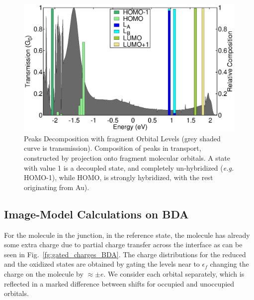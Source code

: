 \documentclass[aip,jcp,a4paper,reprint,floatfix,superscriptaddress]{revtex4-1}
\newcommand{\etal}{\emph{et al.}\xspace}
\newcommand{\eg}{\emph{e.g.}\xspace}
\begin{document}
\begin{figure}
   \includegraphics[width=\columnwidth]{img/BDA/BDA-decomposition}
\caption{Peaks Decomposition with fragment Orbital Levels (grey shaded curve is transmission). Composition of peaks in transport, constructed by projection onto fragment molecular orbitals. A state with value 1 is a decoupled state, and completely un-hybridized (\eg HOMO-1), while HOMO, is strongly hybridized, with the rest originating from Au).}\label{fg:BDA-peak-composition}
\end{figure}



\subsection{Image-Model Calculations on BDA}\label{imagemodelcalcsBDA}

For the molecule in the junction, %
in the reference state, the molecule %
has already some extra charge due to partial charge transfer across the interface \cite{Thygesen2009} as can be seen in Fig.~\ref{fg:gated_charges_BDA}. The charge distributions for the reduced and the oxidized states are obtained by gating the levels near to $\epsilon_f$ changing the charge on the molecule by $\approx \pm e$. We consider each orbital separately, which is reflected in a marked difference between shifts for occupied and unoccupied orbitals.
\end{document}
